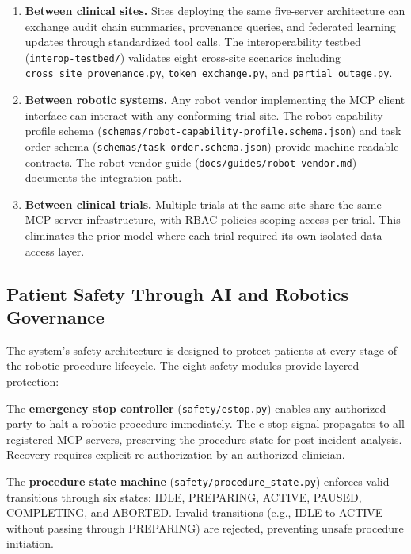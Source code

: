 \documentclass{article}
\begin{document}
\begin{enumerate}[leftmargin=*]
\item \textbf{Between clinical sites.} Sites deploying the same five-server architecture can exchange audit chain summaries, provenance queries, and federated learning updates through standardized tool calls. The interoperability testbed (\texttt{interop-testbed/}) validates eight cross-site scenarios including \texttt{cross\_site\_provenance.py}, \texttt{token\_exchange.py}, and \texttt{partial\_outage.py}.

\item \textbf{Between robotic systems.} Any robot vendor implementing the MCP client interface can interact with any conforming trial site. The robot capability profile schema (\texttt{schemas/robot-capability-profile.schema.json}) and task order schema (\texttt{schemas/task-order.schema.json}) provide machine-readable contracts. The robot vendor guide (\texttt{docs/guides/robot-vendor.md}) documents the integration path.

\item \textbf{Between clinical trials.} Multiple trials at the same site share the same MCP server infrastructure, with RBAC policies scoping access per trial. This eliminates the prior model where each trial required its own isolated data access layer.
\end{enumerate}

\subsection{Patient Safety Through AI and Robotics Governance}

The system's safety architecture is designed to protect patients at every stage of the robotic procedure lifecycle. The eight safety modules provide layered protection:

The \textbf{emergency stop controller} (\texttt{safety/estop.py}) enables any authorized party to halt a robotic procedure immediately. The e-stop signal propagates to all registered MCP servers, preserving the procedure state for post-incident analysis. Recovery requires explicit re-authorization by an authorized clinician.

The \textbf{procedure state machine} (\texttt{safety/procedure\_state.py}) enforces valid transitions through six states: IDLE, PREPARING, ACTIVE, PAUSED, COMPLETING, and ABORTED. Invalid transitions (e.g., IDLE to ACTIVE without passing through PREPARING) are rejected, preventing unsafe procedure initiation.
\end{document}

